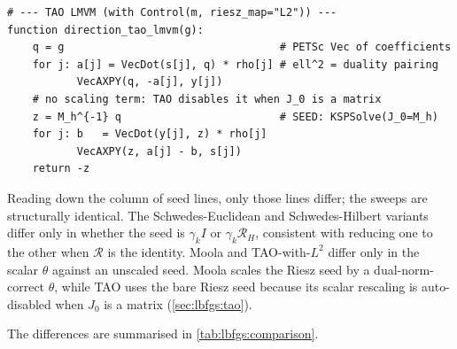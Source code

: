 \documentclass[a4paper,11pt]{article}
\newcommand{\Rmap}{\mathcal{R}}              %
\theoremstyle{spacedplain} \newtheorem{theorem}[counter]{Theorem} \newtheorem{lemma}[counter]{Lemma} \newtheorem{prop}[counter]{Proposition} \newtheorem{cor}[counter]{Corollary}
\theoremstyle{spaceddefinition} \newtheorem{defn}[counter]{Definition} \newtheorem{example}[counter]{Example} \newtheorem{remark}[counter]{Remark}
\begin{document}
\begin{lstlisting}[basicstyle=\ttfamily\footnotesize]
# --- TAO LMVM (with Control(m, riesz_map="L2")) ---
function direction_tao_lmvm(g):
    q = g                                  # PETSc Vec of coefficients
    for j: a[j] = VecDot(s[j], q) * rho[j] # ell^2 = duality pairing
           VecAXPY(q, -a[j], y[j])
    # no scaling term: TAO disables it when J_0 is a matrix
    z = M_h^{-1} q                         # SEED: KSPSolve(J_0=M_h)
    for j: b   = VecDot(y[j], z) * rho[j]
           VecAXPY(z, a[j] - b, s[j])
    return -z
\end{lstlisting}

Reading down the column of seed lines, only those lines differ; the sweeps are structurally identical. The Schwedes-Euclidean and Schwedes-Hilbert variants differ only in whether the seed is $\gamma_k I$ or $\gamma_k \Rmap_H$, consistent with \citet[(1.208)]{shfp2017} reducing one to the other when $\Rmap$ is the identity. Moola and TAO-with-$L^{2}$ differ only in the scalar $\theta$ against an unscaled seed. Moola scales the Riesz seed by a dual-norm-correct $\theta$, while TAO uses the bare Riesz seed because its scalar rescaling is auto-disabled when $J_0$ is a matrix (\cref{sec:lbfgs:tao}).


The differences are summarised in \cref{tab:lbfgs:comparison}.
\end{document}
